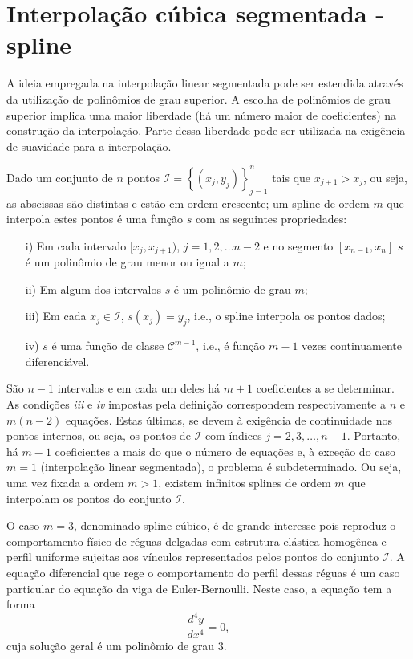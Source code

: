 \section{Interpolação cúbica segmentada - spline}
A ideia empregada na interpolação linear segmentada pode ser estendida através da utilização de polinômios de grau superior. A escolha de polinômios de grau superior implica uma maior liberdade (há um número maior de coeficientes) na construção da interpolação. Parte dessa liberdade pode ser utilizada na exigência de suavidade para a interpolação.

\begin{defn}Dado um conjunto de $n$ pontos $\mathcal{I}=\left\{(x_j,y_j)\right\}_{j=1}^n$ tais que $x_{j+1}>x_j$, ou seja, as abscissas são distintas e estão em ordem crescente; um spline de ordem $m$ que interpola estes pontos é uma função $s$ com as seguintes propriedades:
\begin{itemize}
\item[i)] Em cada intervalo $[x_j,x_{j+1})$, $j=1,2,\ldots n-2$ e no segmento $[x_{n-1},x_n]$ $s$ é um polinômio de grau menor ou igual a  $m$;
\item[ii)] Em algum dos intervalos $s$ é um polinômio de grau $m$;
\item[iii)] Em cada $x_j\in \mathcal{I}$, $s(x_j)=y_j$, i.e., o spline interpola os pontos dados;
\item[iv)] $s$ é uma função de classe $\mathcal{C}^{m-1}$, i.e., é função $m-1$ vezes continuamente diferenciável.
\end{itemize}
\end{defn}

São $n-1$ intervalos e em cada um deles há $m+1$ coeficientes a se determinar. As condições \textit{iii} e \textit{iv} impostas pela definição correspondem respectivamente a $n$ e $m(n-2)$ equações. Estas últimas, se devem à exigência de continuidade nos pontos internos, ou seja, os pontos de $\mathcal{I}$ com índices $j=2,3,\ldots,n-1$. Portanto, há $m-1$ coeficientes a mais do que o número de equações e, à exceção do caso $m=1$ (interpolação linear segmentada), o problema é subdeterminado. Ou seja, uma vez fixada a ordem $m>1$, existem infinitos splines de ordem $m$ que interpolam os pontos do conjunto $\mathcal{I}$.

O caso $m=3$, denominado spline cúbico, é de grande interesse pois reproduz o comportamento físico de réguas delgadas com estrutura elástica homogênea e perfil uniforme sujeitas aos vínculos representados pelos pontos  do conjunto $\mathcal{I}$. A equação diferencial que rege o comportamento do perfil dessas réguas é um caso particular do equação da viga de Euler-Bernoulli. Neste caso, a equação tem a forma 
\begin{equation}\label{eq:ed-splin3}
\dfrac{d^4y}{dx^4}=0,
\end{equation}
cuja solução geral é um polinômio de grau 3. 


